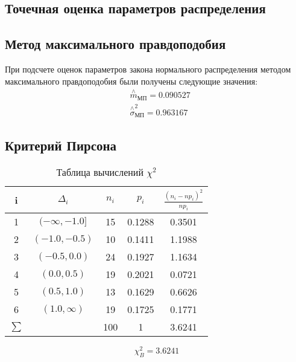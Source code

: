 \documentclass[a4]{article}
\begin{document}
\subsection{Точечная оценка параметров распределения}
\subsection{Метод максимального правдоподобия}

При подсчете оценок параметров закона нормального распределения методом максимального правдоподобия были получены следующие значения:
\begin{equation}
\begin{split}
&\overset{\wedge}{m}_{\text{МП}} = 0.090527\\
&  \overset{\wedge}{\sigma}^2_{\text{МП}} = 0.963167
\end{split}
\end{equation}
\subsection{Критерий Пирсона}
\begin{table}[H]
	\caption{Таблица вычислений $\chi^2$}
	\label{tab:my_label1}
	\begin{center}
		\vspace{5mm}
		\begin{tabular}{|c|c|c|c|c|}
			\hline
			i & $\Delta_i$ & $n_i$ & $p_i$ & $\frac{(n_i-np_i)^2}{np_i}$\\
			\hline
			1&	 $(-\infty, -1.0]$ &	15  &	 0.1288 &	 0.3501\\
			\hline
			2&	$(-1.0, -0.5)$&	10&	 0.1411&	  1.1988\\
			\hline
			3& $(-0.5, 0.0)$&	24&	 0.1927&	 1.1634\\
			\hline
			4&	$(0.0, 0.5)$&	19&	 0.2021&	 0.0721\\
			\hline
			5& $(0.5, 1.0)$&	13&	 0.1629&	 0.6626\\
			\hline
			6& $(1.0, \infty)$&	19&	 0.1725&	 0.1771\\
			\hline
			$\sum$&&		100&	1  & 3.6241	\\
			
			\hline
		\end{tabular}
	\end{center}
\end{table}

$$\chi_B^2= 3.6241$$
\end{document}
